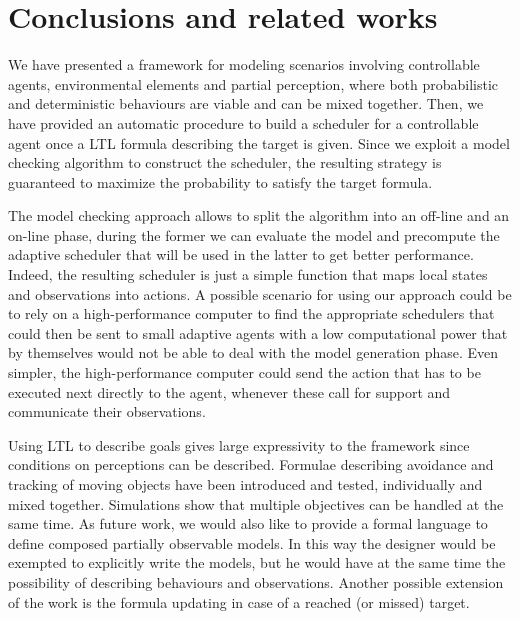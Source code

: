 \vspace{-.3cm}
\section{Conclusions and related works} %
\label{sec:conclusions}

We have presented a framework for modeling scenarios involving controllable agents, environmental elements and partial perception, where both probabilistic and deterministic behaviours are viable and can be mixed together. Then, we have provided an automatic procedure to build a scheduler for a controllable agent once a \ac{LTL} formula describing the target is given. Since we exploit a model checking algorithm to construct the scheduler, the resulting strategy is guaranteed to maximize the probability to satisfy the target formula.

The model checking approach allows to split the algorithm into an off-line and an on-line phase, during the former we can evaluate the model and precompute the adaptive scheduler that will be used in the latter to get better performance. Indeed, %
the resulting scheduler is just a simple function that maps local states and observations into actions. A possible scenario for using our approach could be to rely on  a high-performance computer to find the appropriate schedulers that could then be sent to small adaptive agents with a low computational power that by themselves would not be able to deal with the model generation phase. Even simpler, the high-performance computer could send the action that has to be executed next directly to the agent, whenever these call for support and communicate their observations.

Using \ac{LTL} to describe goals gives large expressivity to the framework since conditions on perceptions can be described. Formulae describing avoidance and tracking of moving objects have been introduced and tested, individually and mixed together. Simulations show that multiple objectives can be handled at the same time. 
%
As future work, we would also like to provide a formal language to define composed partially observable models. In this way the designer would be exempted to explicitly write the models, but he would have at the same time the possibility of describing behaviours and observations. Another possible extension of the work is the formula updating in case of a reached (or missed) target.

